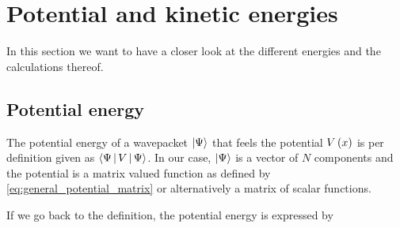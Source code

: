\section{Potential and kinetic energies}

In this section we want to have a closer look at the different energies and the
calculations thereof.

\subsection{Potential energy}

The potential energy of a wavepacket $\Ket{\Psi}$ that feels the potential $V\left( x \right)$
is per definition given as $\Braket{\Psi | V | \Psi}$. In our case, $\Ket{\Psi}$
is a vector of $N$ components and the potential is a matrix valued function as
defined by \eqref{eq:general_potential_matrix} or alternatively a matrix of scalar
functions.

If we go back to the definition, the potential energy is expressed by

